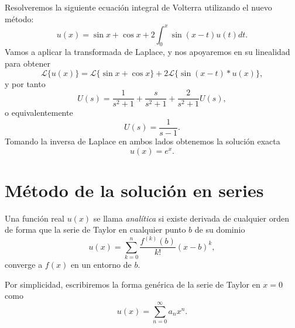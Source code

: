 \begin{ejemplo}
	Resolveremos la siguiente ecuación integral de Volterra utilizando el nuevo método:
	\begin{equation}
		u(x) = \sin x + \cos x + 2 \int_{0}^{x} \sin (x-t)u(t)dt.
	\end{equation}
	Vamos a aplicar la transformada de Laplace, y nos apoyaremos en su linealidad para obtener
	\begin{equation}
		\mathcal{L}\{u(x)\} = \mathcal{L}\{\sin x + \cos x\} + 2\mathcal{L}\{\sin (x-t) \ast u(x)\},
	\end{equation}
	y por tanto
	\begin{equation}
		U(s) = \dfrac{1}{s^2+1}+\dfrac{s}{s^2+1}+\dfrac{2}{s^2+1}U(s),
	\end{equation}
	o equivalentemente
	\begin{equation}
		U(s) = \dfrac{1}{s-1}.
	\end{equation}
	Tomando la inversa de Laplace en ambos lados obtenemos la solución exacta
	\begin{equation}
		u(x) = e^x.
	\end{equation}
\end{ejemplo}

\section{Método de la solución en series}
\begin{definicion}
	Una función real $u(x)$ se llama \textit{analítica} si existe derivada de cualquier orden de forma que la serie de Taylor en cualquier punto $b$ de su dominio
	\begin{equation}
		u(x) = \sum_{k=0}^{n}\dfrac{f^{(k)}(b)}{k!}(x-b)^k,
	\end{equation}
	converge a $f(x)$ en un entorno de $b$.
\end{definicion}
Por simplicidad, escribiremos la forma genérica de la serie de Taylor en $x = 0$ como
\begin{equation}\label{eq:serie1}
	u(x) = \sum_{n=0}^{\infty}a_nx^n.
\end{equation}

